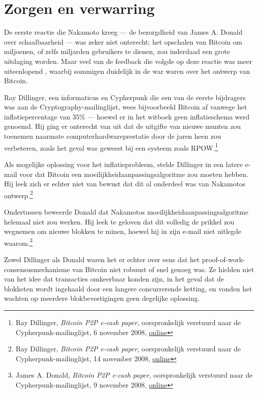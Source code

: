 \documentclass[
  a5paper,
  smalldemyvopaper,11pt,twoside,onecolumn,openright,extrafontsizes,
hidelinks]{memoir}
\begin{document}
\section{Zorgen en verwarring}\label{zorgen-en-verwarring}

De eerste reactie die Nakamoto kreeg --- de bezorgdheid van James A.
Donald over schaalbaarheid --- was zeker niet onterecht; het opschalen
van Bitcoin om miljoenen, of zelfs miljarden gebruikers te dienen, zou
inderdaad een grote uitdaging worden. Maar veel van de feedback die
volgde op deze reactie was meer uiteenlopend , waarbij sommigen
duidelijk in de war waren over het ontwerp van Bitcoin.

Ray Dillinger, een informaticus en Cypherpunk die een van de eerste
bijdragers was aan de Cryptography-mailinglijst, wees bijvoorbeeld
Bitcoin af vanwege het inflatiepercentage van 35\% --- hoewel er in het
witboek geen inflatieschema werd genoemd. Hij ging er onterecht van uit
dat de uitgifte van nieuwe munten zou toenemen naarmate
computerhardwareprestatie door de jaren heen zou verbeteren, zoals het
geval was geweest bij een systeem zoals RPOW.\footnote{Ray Dillinger,
  \emph{Bitcoin P2P e-cash paper}, oorspronkelijk verstuurd naar de
  Cypherpunk-mailinglijst, 6 november 2008,
  \href{https://www.metzdowd.com/pipermail/cryptography/2008-November/014822.html}{online}}

Als mogelijke oplossing voor het inflatieprobleem, stelde Dillinger in
een latere e-mail voor dat Bitcoin een moeilijkheidaanpassingsalgoritme
zou moeten hebben. Hij leek zich er echter niet van bewust dat dit al
onderdeel was van Nakamotos ontwerp.\footnote{Ray Dillinger,
  \emph{Bitcoin P2P e-cash paper}, oorspronkelijk verstuurd naar de
  Cypherpunk-mailinglijst, 14 november 2008,
  \href{https://www.metzdowd.com/pipermail/cryptography/2008-November/014857.html}{online}}

Ondertussen beweerde Donald dat Nakamotos
moeilijkheidaanpassingsalgoritme helemaal niet zou werken. Hij leek te
geloven dat dit volledig de prikkel zou wegnemen om nieuwe blokken te
minen, hoewel hij in zijn e-mail niet uitlegde waarom.\footnote{James A.
  Donald, \emph{Bitcoin P2P e-cash paper}, oorspronkelijk verstuurd naar
  de Cypherpunk-mailinglijst, 9 november 2008,
  \href{https://www.metzdowd.com/pipermail/cryptography/2008-November/014837.html}{online}}

Zowel Dillinger als Donald waren het er echter over eens dat het
proof-of-work-consensusmechanisme van Bitcoin niet robuust of snel
genoeg was. Ze hielden niet van het idee dat transacties omkeerbaar
konden zijn, in het geval dat de blokketen wordt ingehaald door een
langere concurrerende ketting, en vonden het wachten op meerdere
blokbevestigingen geen degelijke oplossing.
\end{document}
